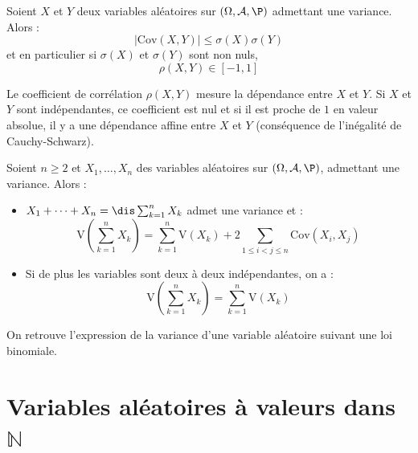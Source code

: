 \documentclass[a4paper,10pt]{report}
\begin{document}
\begin{prop} Soient $X$ et $Y$ deux variables aléatoires sur $(\Omega, \mathcal{A}, \P)$ admettant une variance. Alors :
$$ \vert \textrm{Cov}(X,Y) \vert \leq \sigma(X) \sigma(Y)$$
et en particulier si $\sigma(X)$ et $\sigma(Y)$ sont non nuls, 
$$ \rho(X,Y) \in [-1,1]$$
\end{prop}

\begin{preuve}

\vspace{4cm}
\end{preuve}

\begin{rem} Le coefficient de corrélation $\rho(X,Y)$ \og mesure la dépendance \fg entre $X$ et $Y$. Si $X$ et $Y$ sont indépendantes, ce coefficient est nul et si il est proche de $1$ en valeur absolue, il y a une \og dépendance affine \fg entre $X$ et $Y$ (conséquence de l'inégalité de Cauchy-Schwarz).
\end{rem}

\begin{prop}
Soient $n \geq 2$ et $X_1, \ldots, X_n$ des variables aléatoires sur $(\Omega, \mathcal{A}, \P)$, admettant une variance. Alors :
\begin{itemize}
\item $X_1 + \cdots + X_n = \dis \sum_{k=1}^n X_k$ admet une variance et :
$$ \textrm{V} \left(\sum_{k=1}^n X_k \right) = \sum_{k=1}^n \textrm{V}(X_k) + 2 \sum_{1\leq i<j \leq n} \textrm{Cov}(X_i,X_j)$$
\item Si de plus les variables sont deux à deux indépendantes, on a :
$$ \textrm{V} \left(\sum_{k=1}^n X_k \right) = \sum_{k=1}^n \textrm{V}(X_k)$$
\end{itemize}
\end{prop}

\begin{preuve}
\vspace{10cm}
\end{preuve}

\begin{rem} On retrouve l'expression de la variance d'une variable aléatoire suivant une loi binomiale.

\vspace{5cm}
\end{rem}

\section{Variables aléatoires à valeurs dans $\mathbb{N}$}
\end{document}
